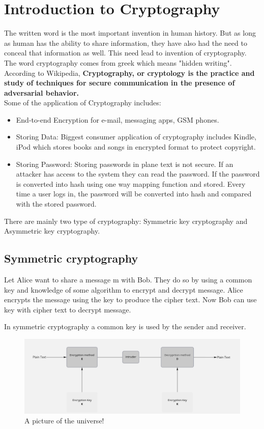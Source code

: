 \documentclass[12pt,a4paper]{report}
\begin{document}
\section{Introduction to Cryptography}
The written word is the most important invention in human history. But as long as human has the ability to share information, they have also had the need to conceal that information as well. This need lead to invention of cryptography.\\
The word cryptography comes from greek which means "hidden writing". According to Wikipedia, \textbf{Cryptography, or cryptology is the practice and study of techniques for secure communication in the presence of adversarial behavior.}
\\Some of the application of Cryptography includes:
\begin{itemize}
	\item End-to-end Encryption for e-mail, messaging apps, GSM phones.
	\item Storing Data: Biggest consumer application of cryptography includes Kindle, iPod which stores books and songs in encrypted format to protect copyright.
	\item Storing Password: Storing passwords in plane text is not secure. If an attacker has access to the system they can read the password. If the password is converted into hash using one way mapping function and stored. Every time a user logs in, the password will be converted into hash and compared with the stored password.
\end{itemize}
There are mainly two type of cryptography: Symmetric key cryptography and Asymmetric key cryptography. 	
\cleardoublepage

	
\subsection{Symmetric cryptography}
Let Alice want to share a message m with Bob. They do so by using a common key and knowledge of some algorithm to encrypt and decrypt message. Alice encrypts the message using the key to produce the cipher text. Now Bob can use key with cipher text to decrypt message. 

In symmetric cryptography a common key is used by the sender and receiver. 
\vspace{2cm}

\begin{figure}[h!]
\begin{center}
 \caption{A picture of the universe!}
\includegraphics[scale=0.36]{sym}
\end{center}
\end{figure}
\end{document}
